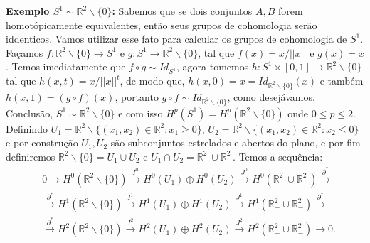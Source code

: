 \documentclass{article}
\begin{document}
	
	\textbf{Exemplo $S^{1} \sim \mathbb{R}^{2} \backslash \{0\}$:} Sabemos que se dois conjuntos $A, B$ forem homotópicamente equivalentes, então seus grupos de cohomologia serão iddenticos. Vamos utilizar esse fato para calcular os grupos de cohomologia de $S^{1}$. Façamos $f: \mathbb{R}^{2} \backslash \{0\} \to S^{1}$ e $g: S^{1} \to \mathbb{R}^{2} \backslash \{0\}$, tal que $f(x) = x/||x||$ e $g(x) = x$. Temos imediatamente que $f \circ g \sim Id_{S^{1}}$, agora tomemos $h: S^{1} \times [0,1] \to \mathbb{R}^{2} \backslash \{0\}$ tal que 
	$h(x,t) = x/||x||^{t}$, de modo que, $h(x, 0) = x = Id_{\mathbb{R}^{2} \backslash \{0\}}(x)$ e também $h(x, 1) = (g \circ f)(x)$, portanto $g \circ f \sim Id_{\mathbb{R}^{2} \backslash \{0\}}$, como desejávamos. Conclusão, $S^{1} \sim \mathbb{R}^{2} \backslash \{0\}$ e com isso $H^{p}(S^{1}) = H^{p}(\mathbb{R}^{2} \backslash \{0\})$ onde $0 \leq p \leq 2$.
	Definindo $U_{1} = \mathbb{R}^{2} \backslash \{(x_{1}, x_{2}) \in \mathbb{R}^{2} : x_{1} \geq 0 \}$, $U_{2} = \mathbb{R}^{2} \backslash \{(x_{1}, x_{2}) \in \mathbb{R}^{2} : x_{2} \leq 0 \}$ e por construção $U_{1}, U_{2}$ são subconjuntos estrelados e abertos do plano, e por fim definiremos $\mathbb{R}^{2} \backslash \{0\} = U_{1} \cup U_{2}$ e $U_{1}\cap U_{2} = \mathbb{R}^{2}_{+} \cup \mathbb{R}^{2}_{-}$. Temos a sequência:
	$$
	\begin{aligned}
	& 0 \to H^{0}(\mathbb{R}^{2} \backslash \{0\} ) \xrightarrow{I^{0}} H^{0}(U_{1}) \oplus H^{0}(U_{2}) \xrightarrow{J^{0}} H^{0}(\mathbb{R}^{2}_{+} \cup \mathbb{R}^{2}_{-}) \xrightarrow{\partial^{*}} 
	\\
	&\xrightarrow{\partial^{*}} H^{1}(\mathbb{R}^{2} \backslash \{0\} ) \xrightarrow{I^{1}} H^{1}(U_{1}) \oplus H^{1}(U_{2}) \xrightarrow{J^{1}} H^{1}(\mathbb{R}^{2}_{+} \cup \mathbb{R}^{2}_{-}) \xrightarrow{\partial^{*}} 
	\\
	&\xrightarrow{\partial^{*}} H^{2}(\mathbb{R}^{2} \backslash \{0\} ) \xrightarrow{I^{2}} H^{2}(U_{1}) \oplus H^{2}(U_{2}) \xrightarrow{J^{2}} H^{2}(\mathbb{R}^{2}_{+} \cup \mathbb{R}^{2}_{-}) \to 0.
	\end{aligned}
	$$
\end{document}

